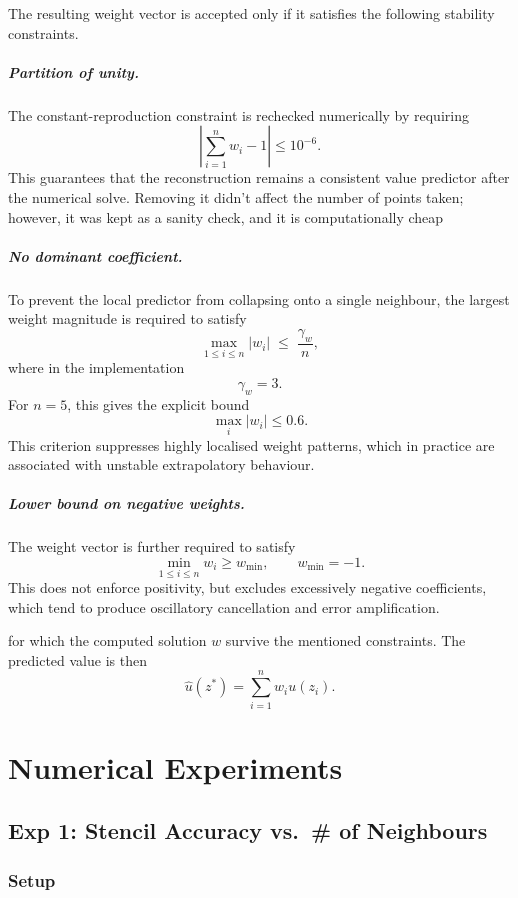 \documentclass[12pt, a4paper, twoside]{report}
\theoremstyle{plain}
\theoremstyle{definition}
\begin{document}
The resulting weight vector is accepted only if it satisfies the following stability constraints.

\paragraph{Partition of unity.}
The constant-reproduction constraint is rechecked numerically by requiring
\[
\left|\sum_{i=1}^n w_i - 1\right| \le 10^{-6}.
\]
This guarantees that the reconstruction remains a consistent value predictor after the numerical solve. Removing it didn't affect the number of points taken; however, it was kept as a sanity check, and it is computationally cheap

\paragraph{No dominant coefficient.}
To prevent the local predictor from collapsing onto a single neighbour, the largest weight magnitude is required to satisfy
\[
\max_{1\le i\le n}|w_i|
\;\le\;
\frac{\gamma_w}{n},
\]
where in the implementation
\[
\gamma_w = 3.
\]
For $n=5$, this gives the explicit bound
\[
\max_i |w_i| \le 0.6.
\]
This criterion suppresses highly localised weight patterns, which in practice are associated with unstable extrapolatory behaviour.

\paragraph{Lower bound on negative weights.}
The weight vector is further required to satisfy
\[
\min_{1\le i\le n} w_i \ge w_{\min},
\qquad
w_{\min}=-1.
\]
This does not enforce positivity, but excludes excessively negative coefficients, which tend to produce oscillatory cancellation and error amplification.

 
for which the computed solution $w$ survive the mentioned constraints. The predicted value is then
\[
\hat u(z^*) = \sum_{i=1}^n w_i u(z_i).
\]
 

\chapter{Numerical Experiments}
\label{chap:experiments}
\section{Exp 1: Stencil Accuracy vs.\ \# of Neighbours}
\label{sec:exp1}

\subsection{Setup}
\end{document}
